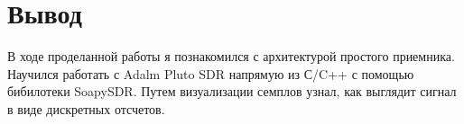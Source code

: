 \chapter{Вывод}
\label{ch:chap3}

В ходе проделанной работы я познакомился с архитектурой простого приемника. Научился работать с Adalm Pluto SDR напрямую из 
С/C++ с помощью бибилотеки SoapySDR. Путем визуализации семплов узнал, как выглядит сигнал в виде дискретных отсчетов.

\endinput